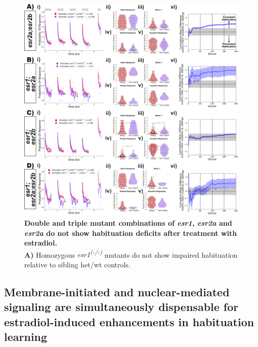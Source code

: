 \documentclass[9pt,lineno]{RandlettLab_elife}
\begin{document}
{\begin{figure}
\begin{fullwidth}
\begin{center}
\includegraphics[width=0.95\linewidth]{figures/NuclearDoubleAndTripleMutants.png}
\caption{ \textbf{Double and triple mutant combinations of \emph{esr1}, \emph{esr2a} and \emph{esr2a} do not show habituation deficits after treatment with estradiol.}
\\ \textbf{A)} Homozygous \emph{esr1\textsuperscript{(-/-)}} mutants do not show impaired habituation relative to sibling het/wt controls. 
}
\label{fig:4}

\end{center}
\end{fullwidth}
\end{figure}

\subsection{Membrane-initiated and nuclear-mediated signaling are simultaneously dispensable for estradiol-induced enhancements in habituation learning}

}
\end{document}

